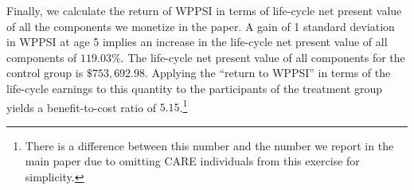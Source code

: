 \noindent Finally, we calculate the return of WPPSI in terms of life-cycle net present value of all the components we monetize in the paper. A gain of 1 standard deviation in WPPSI at age 5 implies an increase in the life-cycle net present value of all components of $119.03\%$. The life-cycle net present value of all components for the control group is $\$753,692.98$. Applying the ``return to WPPSI'' in terms of the life-cycle earnings to this quantity to the participants of the treatment group yields a benefit-to-cost ratio of $5.15$.\footnote{There is a difference between this number and the number we report in the main paper due to omitting CARE individuals from this exercise for simplicity.}\\

\singlespace


